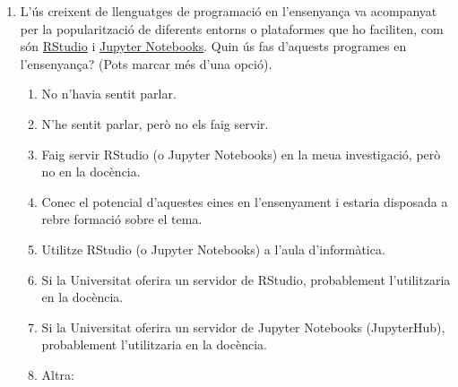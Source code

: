 \documentclass[a4paper,12pt]{article}
\begin{document}
\begin{enumerate}
\item L'ús creixent de llenguatges de programació en l'ensenyança va acompanyat per la
popularització de diferents entorns o plataformes que ho faciliten, com són 
\href{https://education.rstudio.com/teach/}{RStudio} i
\href{https://jupyter4edu.github.io/jupyter-edu-book/}{Jupyter Notebooks}.
Quin ús fas d'aquests programes en l'ensenyança? (Pots marcar més d'una opció).
   \begin{enumerate}
   \item No n'havia sentit parlar.
   \item N'he sentit parlar, però no els faig servir.
   \item Faig servir RStudio (o Jupyter Notebooks) en la meua investigació, però no en la docència.
   \item Conec el potencial d'aquestes eines en l'ensenyament i estaria disposada a rebre formació sobre el tema.
   \item Utilitze RStudio (o Jupyter Notebooks) a l'aula d'informàtica.
   \item Si la Universitat oferira un servidor de RStudio, probablement l'utilitzaria en la docència.
   \item Si la Universitat oferira un servidor de Jupyter Notebooks (JupyterHub), probablement l'utilitzaria en la docència.
   \item Altra:
   \end{enumerate}
\end{enumerate}
\end{document}
